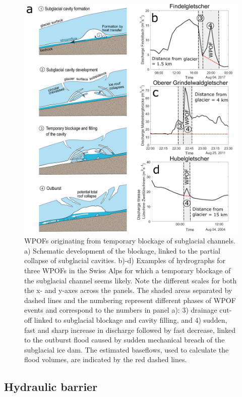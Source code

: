 \begin{figure}
    \centering
    \includegraphics[width=1\textwidth]{chapters/chapter_WPOFs/Temp_blockage.pdf}
    \caption{ WPOFs originating from temporary blockage of subglacial channels. a) Schematic development of the blockage, linked to the partial collapse of subglacial cavities. b)-d) Examples of hydrographs for three WPOFs in the Swiss Alps for which a temporary blockage of the subglacial channel seems likely. Note the different scales for both the x- and y-axes across the panels. The shaded areas separated by dashed lines and the numbering represent different phases of WPOF events and correspond to the numbers in panel a): 3) drainage cut-off linked to subglacial blockage and cavity filling, and 4) sudden, fast and sharp increase in discharge followed by fast decrease, linked to the outburst flood caused by sudden mechanical breach of the subglacial ice dam. The estimated baseflows, used to calculate the flood volumes, are indicated by the red dashed lines.}
    \label{fig:IceBlockage}
\end{figure}


\subsection{ Hydraulic barrier}
\label{sec:hydraulic_barrier}

